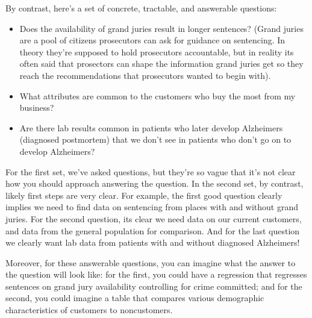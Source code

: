 \documentclass[letterpaper,10pt,english]{jupyterBook}
\begin{document}
\sphinxAtStartPar
By contrast, here’s a set of concrete, tractable, and answerable questions:
\begin{itemize}
\item {} 
\sphinxAtStartPar
Does the availability of grand juries result in longer sentences? (Grand juries are a pool of citizens prosecutors can ask for guidance on sentencing. In theory they’re supposed to hold prosecutors accountable, but in reality its often said that prosectors can shape the information grand juries get so they reach the recommendations that prosecutors wanted to begin with).

\item {} 
\sphinxAtStartPar
What attributes are common to the customers who buy the most from my business?

\item {} 
\sphinxAtStartPar
Are there lab results common in patients who later develop Alzheimers (diagnosed post\sphinxhyphen{}mortem) that we don’t see in patients who don’t go on to develop Alzheimers?

\end{itemize}

\sphinxAtStartPar
For the first set, we’ve asked questions, but they’re so vague that it’s not clear how you should approach answering the question. In the second set, by contrast, likely first steps are very clear. For example, the first good question clearly implies we need to find data on sentencing from places with and without grand juries. For the second question, its clear we need data on our current customers, and data from the general population for comparison. And for the last question we clearly want lab data from patients with and without diagnosed Alzheimers!

\sphinxAtStartPar
Moreover, for these answerable questions, you can imagine what the answer to the question will look like: for the first, you could have a regression that regresses sentences on grand jury availability controlling for crime committed; and for the second, you could imagine a table that compares various demographic characteristics of customers to non\sphinxhyphen{}customers.
\end{document}
